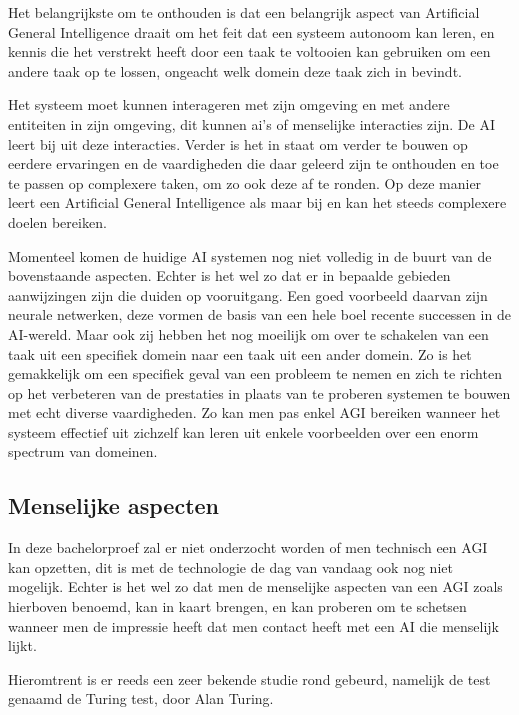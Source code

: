 Het belangrijkste om te onthouden is dat een belangrijk aspect van Artificial General Intelligence draait om het feit dat een systeem autonoom kan leren, en kennis die het verstrekt heeft door een taak te voltooien kan gebruiken om een andere taak op te lossen, ongeacht welk domein deze taak zich in bevindt. 

Het systeem moet kunnen interageren met zijn omgeving en met andere entiteiten in zijn omgeving, dit kunnen ai's of menselijke interacties zijn. De AI leert bij uit deze interacties. Verder is het in staat om verder te bouwen op eerdere ervaringen en de vaardigheden die daar geleerd zijn te onthouden en toe te passen op complexere taken, om zo ook deze af te ronden. Op deze manier leert een Artificial General Intelligence als maar bij en kan het steeds complexere doelen bereiken.

\autocite{goertzel2007artificial}

Momenteel komen de huidige AI systemen nog niet volledig in de buurt van de bovenstaande aspecten. Echter is het wel zo dat er in bepaalde gebieden aanwijzingen zijn die duiden op vooruitgang. Een goed voorbeeld daarvan zijn neurale netwerken, deze vormen de basis van een hele boel recente successen in de AI-wereld. Maar ook zij hebben het nog moeilijk om over te schakelen van een taak uit een specifiek domein naar een taak uit een ander domein. Zo is het gemakkelijk om een specifiek geval van een probleem te nemen en zich te richten op het verbeteren van de prestaties in plaats van te proberen systemen te bouwen met echt diverse vaardigheden. Zo kan men pas enkel AGI bereiken wanneer het systeem effectief uit zichzelf kan leren uit enkele voorbeelden over een enorm spectrum van domeinen.

\autocite{shevlin2019limits}

\newpage

\subsection{Menselijke aspecten}

In deze bachelorproef zal er niet onderzocht worden of men technisch een AGI kan opzetten, dit is met de technologie de dag van vandaag ook nog niet mogelijk. Echter is het wel zo dat men de menselijke aspecten van een AGI zoals hierboven benoemd, kan in kaart brengen, en kan proberen om te schetsen wanneer men de impressie heeft dat men contact heeft met een AI die menselijk lijkt. 

Hieromtrent is er reeds een zeer bekende  studie rond gebeurd, namelijk de test genaamd de Turing test, door Alan Turing.

